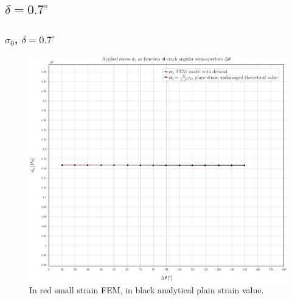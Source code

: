 \documentclass[first,firstsupp,lastsupp,handout,last,hyperref,table]{ETHclass}
\begin{document}


\subsection{$\delta=0.7^{\circ}$}

\begin{frame}
\frametitle{\small $\sigma_{0}$, $\delta=0.7^{\circ}$}
\vspace{-0.5cm}
\centering
\captionsetup[figure]{font=scriptsize,labelfont=scriptsize}
\begin{figure}[!h]
\centering
\includegraphics[height=0.7\textheight]{2017-07-10_AbqRunSummary_SmallStrainD07_sigma-inf_Summary.pdf}
  \caption{\scriptsize In red small strain FEM, in black analytical plain strain value.}
  \label{fig:res1}
\end{figure}
\end{frame}
\end{document}
